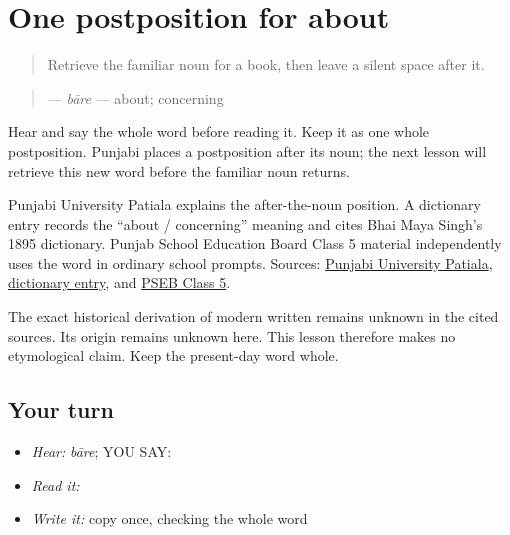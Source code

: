\section[\texorpdfstring{\pa{ਬਾਰੇ} (baare)}{ਬਾਰੇ (baare)}]{One postposition for about}

\label{lesson:PA-C203-baare}



\begin{quote}
Retrieve the familiar noun for a book, then leave a silent space after it.
\end{quote}

\begin{grammarlens}[title={Grammar Lens: direct owner}]
\begin{quote}
\textbf{} — \emph{bāre} — about; concerning
\end{quote}

Hear and say the whole word before reading it. Keep it as one whole postposition. Punjabi places a postposition after its noun; the next lesson will retrieve this new word before the familiar noun returns.
\end{grammarlens}

\begin{cousinweb}
Punjabi University Patiala explains the after-the-noun position. A dictionary entry records the “about / concerning” meaning and cites Bhai Maya Singh's 1895 dictionary. Punjab School Education Board Class 5 material independently uses the word in ordinary school prompts. Sources: \href{https://www.learnpunjabi.org/postposition.html}{Punjabi University Patiala}, \href{https://en.wiktionary.org/wiki/\%E0\%A8\%AC\%E0\%A8\%BE\%E0\%A8\%B0\%E0\%A9\%87}{dictionary entry}, and \href{https://static.pseb.ac.in/media/1654685607\_5th\%20Punjabi-second-language.pdf}{PSEB Class 5}.

The exact historical derivation of modern written \textbf{} remains unknown in the cited sources. Its origin remains unknown here. This lesson therefore makes no etymological claim. Keep the present-day word whole.
\end{cousinweb}

\subsection*{Your turn}
\begin{itemize}
\raggedright
  \item \emph{Hear:} \emph{bāre}; YOU SAY: \textbf{}
  \item \emph{Read it:} \textbf{}
  \item \emph{Write it:} copy \textbf{} once, checking the whole word
\end{itemize}

